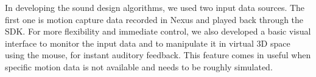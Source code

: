 In developing the sound design algorithms, we used two input data sources. The first one is motion capture data recorded in Nexus and played back through the SDK. For more flexibility and immediate control, we also developed a basic visual interface to monitor the input data and to manipulate it in virtual 3D space using the mouse, for instant auditory feedback. This feature comes in useful when specific motion data is not available and needs to be roughly simulated.

%
%
%
%
%
%
%
%
